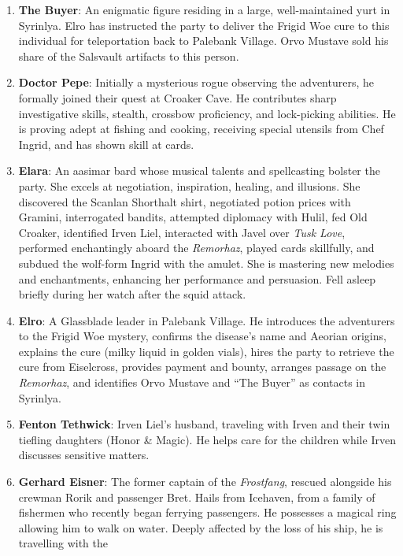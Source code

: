 \documentclass[
  letterpaper,12pt,twoside,twocolumn,openany,
  nodeprecatedcode,bg=full]{dndbook}
\begin{document}
\begin{enumerate}
  his request for diversion.
\item
  \textbf{The Buyer}: An enigmatic figure residing in a large,
  well-maintained yurt in Syrinlya. Elro has instructed the party to
  deliver the Frigid Woe cure to this individual for teleportation back
  to Palebank Village. Orvo Mustave sold his share of the Salsvault
  artifacts to this person.
\item
  \textbf{Doctor Pepe}: Initially a mysterious rogue observing the
  adventurers, he formally joined their quest at Croaker Cave. He
  contributes sharp investigative skills, stealth, crossbow proficiency,
  and lock-picking abilities. He is proving adept at fishing and
  cooking, receiving special utensils from Chef Ingrid, and has shown
  skill at cards.
\item
  \textbf{Elara}: An aasimar bard whose musical talents and spellcasting
  bolster the party. She excels at negotiation, inspiration, healing,
  and illusions. She discovered the Scanlan Shorthalt shirt, negotiated
  potion prices with Gramini, interrogated bandits, attempted diplomacy
  with Hulil, fed Old Croaker, identified Irven Liel, interacted with
  Javel over \emph{Tusk Love}, performed enchantingly aboard the
  \emph{Remorhaz}, played cards skillfully, and subdued the wolf-form
  Ingrid with the amulet. She is mastering new melodies and
  enchantments, enhancing her performance and persuasion. Fell asleep
  briefly during her watch after the squid attack.
\item
  \textbf{Elro}: A Glassblade leader in Palebank Village. He introduces
  the adventurers to the Frigid Woe mystery, confirms the disease's name
  and Aeorian origins, explains the cure (milky liquid in golden vials),
  hires the party to retrieve the cure from Eiselcross, provides payment
  and bounty, arranges passage on the \emph{Remorhaz}, and identifies
  Orvo Mustave and ``The Buyer'' as contacts in Syrinlya.
\item
  \textbf{Fenton Tethwick}: Irven Liel's husband, traveling with Irven
  and their twin tiefling daughters (Honor \& Magic). He helps care for
  the children while Irven discusses sensitive matters.
\item
  \textbf{Gerhard Eisner}: The former captain of the \emph{Frostfang},
  rescued alongside his crewman Rorik and passenger Bret. Hails from
  Icehaven, from a family of fishermen who recently began ferrying
  passengers. He possesses a magical ring allowing him to walk on water.
  Deeply affected by the loss of his ship, he is travelling with the

\end{enumerate}
\end{document}
